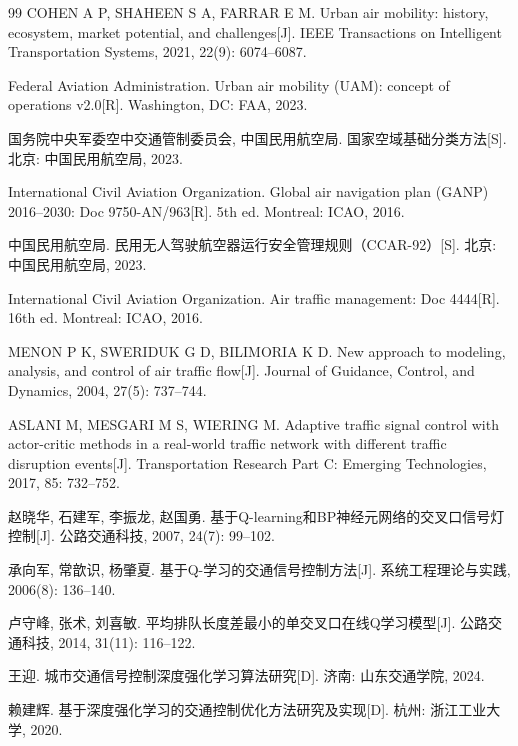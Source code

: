 \documentclass[12pt,a4paper,UTF8]{ctexart}
\begin{document}
\begin{thebibliography}{99}
 COHEN A P, SHAHEEN S A, FARRAR E M. Urban air mobility: history, ecosystem, market potential, and challenges[J]. IEEE Transactions on Intelligent Transportation Systems, 2021, 22(9): 6074--6087.

 Federal Aviation Administration. Urban air mobility (UAM): concept of operations v2.0[R]. Washington, DC: FAA, 2023.

 国务院中央军委空中交通管制委员会, 中国民用航空局. 国家空域基础分类方法[S]. 北京: 中国民用航空局, 2023.

 International Civil Aviation Organization. Global air navigation plan (GANP) 2016--2030: Doc 9750-AN/963[R]. 5th ed. Montreal: ICAO, 2016.

 中国民用航空局. 民用无人驾驶航空器运行安全管理规则（CCAR-92）[S]. 北京: 中国民用航空局, 2023.

 International Civil Aviation Organization. Air traffic management: Doc 4444[R]. 16th ed. Montreal: ICAO, 2016.

 MENON P K, SWERIDUK G D, BILIMORIA K D. New approach to modeling, analysis, and control of air traffic flow[J]. Journal of Guidance, Control, and Dynamics, 2004, 27(5): 737--744.

 ASLANI M, MESGARI M S, WIERING M. Adaptive traffic signal control with actor-critic methods in a real-world traffic network with different traffic disruption events[J]. Transportation Research Part C: Emerging Technologies, 2017, 85: 732--752.

 赵晓华, 石建军, 李振龙, 赵国勇. 基于Q-learning和BP神经元网络的交叉口信号灯控制[J]. 公路交通科技, 2007, 24(7): 99--102.

 承向军, 常歆识, 杨肇夏. 基于Q-学习的交通信号控制方法[J]. 系统工程理论与实践, 2006(8): 136--140.

 卢守峰, 张术, 刘喜敏. 平均排队长度差最小的单交叉口在线Q学习模型[J]. 公路交通科技, 2014, 31(11): 116--122.

 王迎. 城市交通信号控制深度强化学习算法研究[D]. 济南: 山东交通学院, 2024.

 赖建辉. 基于深度强化学习的交通控制优化方法研究及实现[D]. 杭州: 浙江工业大学, 2020.


\end{thebibliography}
\end{document}
